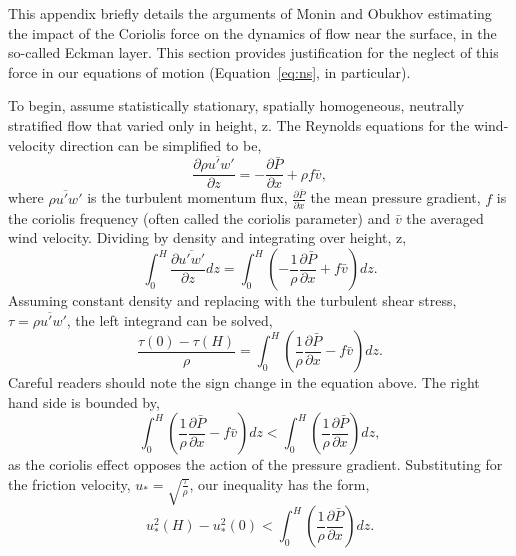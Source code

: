 \label{appendix:coriolis}

This appendix briefly details the arguments of Monin and
Obukhov\cite{monin1954basic} estimating the impact of the Coriolis
force on the dynamics of flow near the surface, in the so-called Eckman
layer. This section provides justification for the neglect of this force
in our equations of motion (Equation~\ref{eq:ns}, in particular). 

To begin, assume statistically stationary, spatially homogeneous,
neutrally stratified flow that varied only in height, z. The Reynolds
equations for the wind-velocity direction can be simplified to be,  
\begin{equation}
 \frac{\partial \overline{\rho u'w'}}{\partial z} = -\frac{\partial
  \bar P}{\partial x} + \rho f \bar v, 
\end{equation}
where $\overline{\rho u'w'}$ is the turbulent momentum flux, $\frac{\partial
\bar P}{\partial x} $  the mean pressure gradient, $f$ is the coriolis
frequency (often called the coriolis parameter) and $\bar v$ the
averaged wind velocity. Dividing by density and integrating over height,
z,  
\begin{equation}
 \int_0^H \frac{\partial \overline{u'w'}}{\partial z} dz = \int_0^H
  \left( -\frac{1}{\rho} \frac{\partial \bar P}{\partial x} + f \bar v
  \right) dz.  
\end{equation}
Assuming constant density and replacing with the turbulent shear stress,
$\tau = \overline{\rho u'w'}$, the left integrand can be solved,  
\begin{equation}
\frac{\tau(0) - \tau(H)}{\rho} = \int_0^H
  \left( \frac{1}{\rho} \frac{\partial \bar P}{\partial x} - f \bar v
  \right) dz.  
\end{equation}
Careful readers should note the sign change in the equation above. The
right hand side is bounded by, 
\begin{equation}
\int_0^H  \left( \frac{1}{\rho} \frac{\partial \bar P}{\partial x} - f \bar v
  \right) dz < \int_0^H  \left( \frac{1}{\rho} \frac{\partial \bar
  P}{\partial x}  \right) dz,
\end{equation}
as the coriolis effect opposes the action of the pressure
gradient. Substituting for the friction velocity, $u_* =
\sqrt{\frac{\tau}{\rho}}$, our inequality has the form,
\begin{equation}
u^2_*(H) - u^2_*(0)  < \int_0^H  \left( \frac{1}{\rho} \frac{\partial
				  \bar P}{\partial x}  \right) dz. 
\label{eq:cor_f}
\end{equation}
